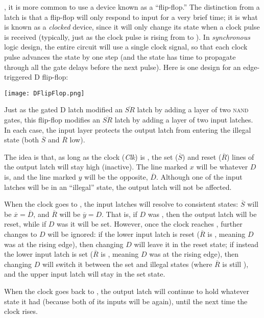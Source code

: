 , it is more common to use a device known as a ``flip-flop.'' The distinction from a latch is that a flip-flop will only respond to input for a very brief time; it is what is known as a \textit{clocked} device, since it will only change its state when a clock pulse is received (typically, just as the clock pulse is rising from \0 to \1). In \emph{synchronous} logic design, the entire circuit will use a single clock signal, so that each clock pulse advances the state by one step (and the state has time to propagate through all the gate delays before the next pulse). Here is one design for an edge-triggered D flip-flop:
\begin{center}
\texttt{[image: DFlipFlop.png]}
\end{center}
Just as the gated D latch modified an $\overline{SR}$ latch by adding a layer of two \textsc{nand} gates, this flip-flop modifies an $\overline{SR}$ latch by adding a layer of two input latches. In each case, the input layer protects the output latch from entering the illegal state (both $\overline{S}$ and $\overline{R}$ low).

The idea is that, as long as the clock (\textit{Clk}) is \0, the set ($\overline{S}$) and reset ($\overline{R}$) lines of the output latch will stay high (inactive). The line marked $x$ will be whatever $D$ is, and the line marked $y$ will be the opposite, $\overline{D}$. Although one of the input latches will be in an ``illegal'' state, the output latch will not be affected.

When the clock goes to \1, the input latches will resolve to consistent states: $\overline{S}$ will be $\overline{x}=\overline{D}$, and $\overline{R}$ will be $\overline{y}=D$. That is, if $D$ was \0, then the output latch will be reset, while if $D$ was \1 it will be set. However, once the clock reaches \1, further changes to $D$ will be ignored: if the lower input latch is reset ($\overline{R}$ is \0, meaning $D$ was \0 at the rising edge), then changing $D$ will leave it in the reset state; if instead the lower input latch is set ($\overline{R}$ is \1, meaning $D$ was \1 at the rising edge), then changing $D$ will switch it between the set and illegal states (where $\overline{R}$ is still \1), and the upper input latch will stay in the set state.

When the clock goes back to \0, the output latch will continue to hold whatever state it had (because both of its inputs will be \1 again), until the next time the clock rises.

